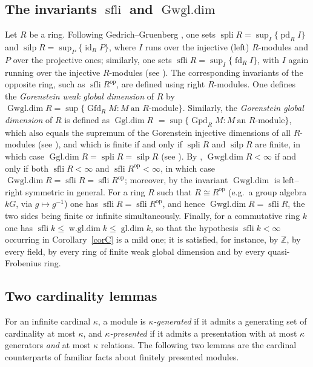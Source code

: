 \documentclass[12pt]{amsart}
\theoremstyle{remark}
\theoremstyle{definition}
\theoremstyle{plain}
\DeclareMathOperator{\Gfd}{Gfd}
\DeclareMathOperator{\Gpd}{Gpd}
\DeclareMathOperator{\fd}{fd}
\DeclareMathOperator{\pd}{pd}
\DeclareMathOperator{\sfli}{sfli}
\DeclareMathOperator{\spli}{spli}
\DeclareMathOperator{\silp}{silp}
\DeclareMathOperator{\id}{id}
\DeclareMathOperator{\Gwgl}{Gwgl.dim}
\DeclareMathOperator{\Ggl}{Ggl.dim}
\DeclareMathOperator{\wgl}{w.gl.dim}
\DeclareMathOperator{\gldim}{gl.dim}
\newcommand{\Z}{\mathbb{Z}}
\begin{document}
\subsection{The invariants \texorpdfstring{$\sfli$}{sfli} and \texorpdfstring{$\Gwgl$}{Gwgl.dim}}

Let $R$ be a ring. Following Gedrich--Gruenberg \cite{GG}, one sets $\spli R=\sup_I\{\pd_RI\}$ and $\silp R=\sup_P\{\id_RP\}$, where $I$ runs over the injective (left) $R$-modules and $P$ over the projective ones; similarly, one sets $\sfli R=\sup_I\{\fd_RI\}$, with $I$ again running over the injective $R$-modules (see \cite{Emm,ET2}). The corresponding invariants of the opposite ring, such as $\sfli R^{\mathrm{op}}$, are defined using right $R$-modules. One defines the \emph{Gorenstein weak global dimension} of $R$ by $\Gwgl R=\sup\{\Gfd_RM:M\ \text{an } R\text{-module}\}$. Similarly, the \emph{Gorenstein global dimension} of $R$ is defined as $\Ggl R$ $=\sup\{\Gpd_RM:M\ \text{an } R\text{-module}\}$, which also equals the supremum of the Gorenstein injective dimensions of all $R$-modules (see \cite[Theorem~1.1]{BM2}), and which is finite if and only if $\spli R$ and $\silp R$ are finite, in which case $\Ggl R=\spli R=\silp R$ (see \cite[Theorem~4.1]{Emm}). By \cite[Theorem~5.3]{Emm}, $\Gwgl R<\infty$ if and only if both $\sfli R<\infty$ and $\sfli R^{\mathrm{op}}<\infty$, in which case $\Gwgl R=\sfli R=\sfli R^{\mathrm{op}}$; moreover, by \cite[Corollary~1.5]{CET} the invariant $\Gwgl$ is left--right symmetric in general. For a ring $R$ such that $R\cong R^{\mathrm{op}}$ (e.g.\ a group algebra $kG$, via $g\mapsto g^{-1}$) one has $\sfli R=\sfli R^{\mathrm{op}}$, and hence $\Gwgl R=\sfli R$, the two sides being finite or infinite simultaneously. Finally, for a commutative ring $k$ one has $\sfli k\le\wgl k\le\gldim k$, so that the hypothesis $\sfli k<\infty$ occurring in Corollary~\ref{corC} is a mild one; it is satisfied, for instance, by $\Z$, by every field, by every ring of finite weak global dimension and by every quasi-Frobenius ring.

\subsection{Two cardinality lemmas}\label{subsec:cardinal}

For an infinite cardinal $\kappa$, a module is \emph{$\kappa$-generated} if it admits a generating set of cardinality at most $\kappa$, and \emph{$\kappa$-presented} if it admits a presentation with at most $\kappa$ generators \emph{and} at most $\kappa$ relations. The following two lemmas are the cardinal counterparts of familiar facts about finitely presented modules.
\end{document}
